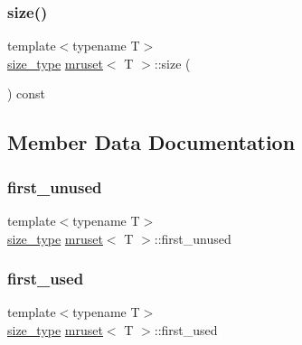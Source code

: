 \mbox{\label{classmruset_a9b1cd4454d0399085c4ec9ddb8611011}} 
\subsubsection{\texorpdfstring{size()}{size()}}
{\footnotesize\ttfamily template$<$typename T$>$ \\
\mbox{\hyperlink{classmruset_aaee46af18d8a5bdc503e9570e499a335}{size\+\_\+type}} \mbox{\hyperlink{classmruset}{mruset}}$<$ T $>$\+::size (\begin{DoxyParamCaption}{ }\end{DoxyParamCaption}) const\hspace{0.3cm}{\ttfamily [inline]}}



\subsection{Member Data Documentation}
\mbox{\label{classmruset_ac425858972aa64260e88d929b19d296d}} 
\subsubsection{\texorpdfstring{first\+\_\+unused}{first\_unused}}
{\footnotesize\ttfamily template$<$typename T$>$ \\
\mbox{\hyperlink{classmruset_aaee46af18d8a5bdc503e9570e499a335}{size\+\_\+type}} \mbox{\hyperlink{classmruset}{mruset}}$<$ T $>$\+::first\+\_\+unused\hspace{0.3cm}{\ttfamily [protected]}}

\mbox{\label{classmruset_ad4c894f683cda5783c8be3aab3214cfd}} 
\subsubsection{\texorpdfstring{first\+\_\+used}{first\_used}}
{\footnotesize\ttfamily template$<$typename T$>$ \\
\mbox{\hyperlink{classmruset_aaee46af18d8a5bdc503e9570e499a335}{size\+\_\+type}} \mbox{\hyperlink{classmruset}{mruset}}$<$ T $>$\+::first\+\_\+used\hspace{0.3cm}{\ttfamily [protected]}}

